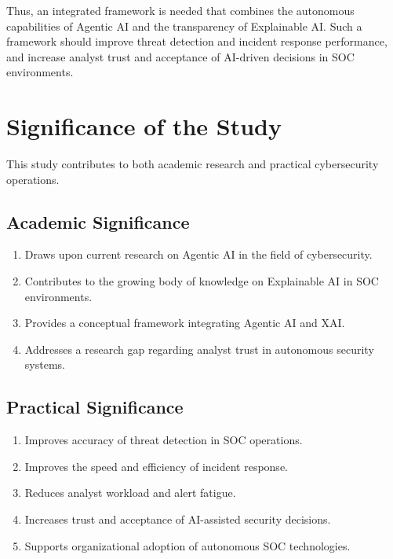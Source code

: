 \documentclass[12pt,a4paper]{report}
\begin{document}
Thus, an integrated framework is needed that combines the autonomous capabilities of Agentic AI and the transparency of Explainable AI. Such a framework should improve threat detection and incident response performance, and increase analyst trust and acceptance of AI-driven decisions in SOC environments.

\section{Significance of the Study}
\label{sec:significance}

This study contributes to both academic research and practical cybersecurity operations.

\subsection{Academic Significance}
\begin{enumerate}[label=\arabic*.]
    \item Draws upon current research on Agentic AI in the field of cybersecurity.
    \item Contributes to the growing body of knowledge on Explainable AI in SOC environments.
    \item Provides a conceptual framework integrating Agentic AI and XAI.
    \item Addresses a research gap regarding analyst trust in autonomous security systems.
\end{enumerate}

\subsection{Practical Significance}
\begin{enumerate}[label=\arabic*.]
    \item Improves accuracy of threat detection in SOC operations.
    \item Improves the speed and efficiency of incident response.
    \item Reduces analyst workload and alert fatigue.
    \item Increases trust and acceptance of AI-assisted security decisions.
    \item Supports organizational adoption of autonomous SOC technologies.
\end{enumerate}

\end{document}

